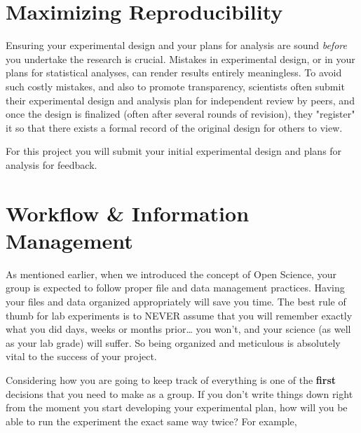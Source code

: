 \documentclass[
]{book}
\begin{document}
\hypertarget{maximizing-reproducibility}{%
\chapter*{Maximizing Reproducibility}\label{maximizing-reproducibility}}

Ensuring your experimental design and your plans for analysis are sound \emph{before} you undertake the research is crucial. Mistakes in experimental design, or in your plans for statistical analyses, can render results entirely meaningless. To avoid such costly mistakes, and also to promote transparency, scientists often submit their experimental design and analysis plan for independent review by peers, and once the design is finalized (often after several rounds of revision), they "register" it so that there exists a formal record of the original design for others to view.

For this project you will submit your initial experimental design and plans for analysis for feedback.

\hypertarget{workflow-information-management}{%
\chapter*{Workflow \& Information Management}\label{workflow-information-management}}

As mentioned earlier, when we introduced the concept of Open Science, your group is expected to follow proper file and data management practices. Having your files and data organized appropriately will save you time. The best rule of thumb for lab experiments is to NEVER assume that you will remember exactly what you did days, weeks or months prior\ldots{} you won't, and your science (as well as your lab grade) will suffer. So being organized and meticulous is absolutely vital to the success of your project.

Considering how you are going to keep track of everything is one of the \textbf{first} decisions that you need to make as a group. If you don't write things down right from the moment you start developing your experimental plan, how will you be able to run the experiment the exact same way twice? For example,
\end{document}
